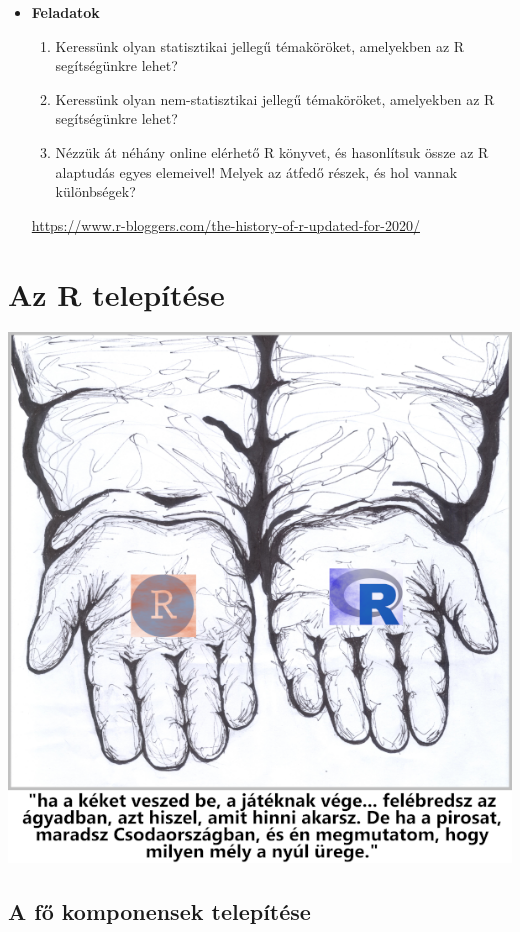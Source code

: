 \documentclass[
]{book}
\providecommand{\tightlist}{%
  \setlength{\itemsep}{0pt}\setlength{\parskip}{0pt}}
\newenvironment{rmdblock}[1]
  {\begin{shaded*}
  \begin{itemize}
  \renewcommand{\labelitemi}{
    \raisebox{-.7\height}[0pt][0pt]{
      {\setkeys{Gin}{width=3em,keepaspectratio}\texttt{[image: images/\#1]}}
    }
  }
  \item
  }
  {
  \end{itemize}
  \end{shaded*}
  }
\newenvironment{rmdexercise}
  {\begin{rmdblock}{exercise}}
  {\end{rmdblock}}
\begin{document}
\begin{rmdexercise}
\textbf{Feladatok}

\begin{enumerate}
\def\labelenumi{\arabic{enumi}.}
\tightlist
\item
  Keressünk olyan statisztikai jellegű témaköröket, amelyekben az R segítségünkre lehet?
\item
  Keressünk olyan nem-statisztikai jellegű témaköröket, amelyekben az R segítségünkre lehet?
\item
  Nézzük át néhány online elérhető R könyvet, és hasonlítsuk össze az R alaptudás egyes elemeivel! Melyek az átfedő részek, és hol vannak különbségek?
\end{enumerate}

\url{https://www.r-bloggers.com/the-history-of-r-updated-for-2020/}
\end{rmdexercise}

\hypertarget{az-r-telepitese}{%
\chapter{Az R telepítése}\label{az-r-telepitese}}

\begin{center}\includegraphics[width=0.7\linewidth]{images/ch_03_small} \end{center}

\hypertarget{a-fux151-komponensek-telepuxedtuxe9se}{%
\section{A fő komponensek telepítése}\label{a-fux151-komponensek-telepuxedtuxe9se}}
\end{document}
